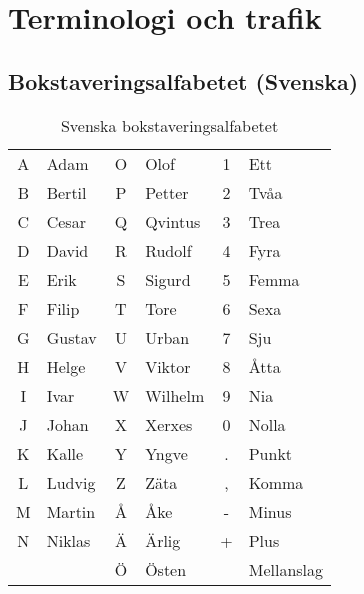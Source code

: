 \section{Terminologi och trafik}

\subsection{Bokstaveringsalfabetet (Svenska)}

\begin{table}[H]
	\centering
\begin{longtable}{cl|cl|cl }
	A & Adam   & O & Olof    & 1 & Ett        \\
	B & Bertil & P & Petter  & 2 & Tvåa       \\
	C & Cesar  & Q & Qvintus & 3 & Trea       \\
	D & David  & R & Rudolf  & 4 & Fyra       \\
	E & Erik   & S & Sigurd  & 5 & Femma      \\
	F & Filip  & T & Tore    & 6 & Sexa       \\
	G & Gustav & U & Urban   & 7 & Sju        \\
	H & Helge  & V & Viktor  & 8 & Åtta       \\
	I & Ivar   & W & Wilhelm & 9 & Nia        \\
	J & Johan  & X & Xerxes  & 0 & Nolla      \\
	K & Kalle  & Y & Yngve   & . & Punkt      \\
	L & Ludvig & Z & Zäta    & , & Komma      \\
	M & Martin & Å & Åke     & - & Minus      \\
	N & Niklas & Ä & Ärlig   & + & Plus       \\
	  &        & Ö & Östen   &   & Mellanslag \\
\end{longtable}
\caption{Svenska bokstaveringsalfabetet}
\end{table}


